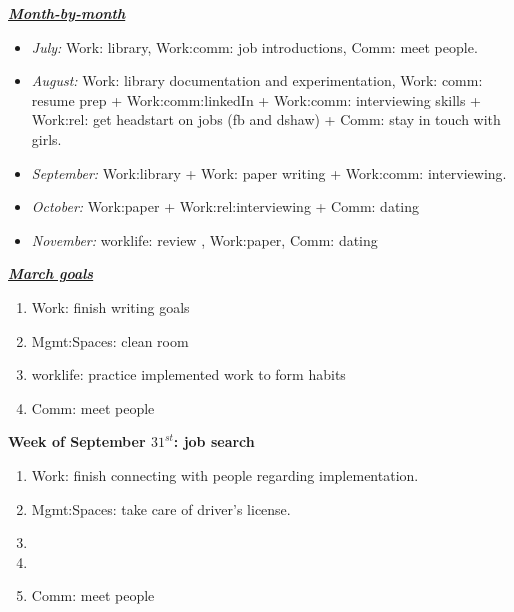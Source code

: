     
    \underline{\it \bf Month-by-month}
      \begin{itemize} 
      \item \small \textit{July:} Work: library, Work:comm: job
        introductions, Comm: meet people.
      \item \small \textit{August:} Work: library documentation and
        experimentation, Work: comm: resume prep + Work:comm:linkedIn
        + Work:comm: interviewing skills + Work:rel: get headstart on
        jobs (fb and dshaw) + Comm: stay in touch with girls. 
      \item \small \textit{September:} Work:library + Work: paper
        writing + Work:comm: interviewing. 
      \item \small \textit{October:} Work:paper +
        Work:rel:interviewing + Comm: dating 
      \item \small \textit{November:} worklife: review , Work:paper, Comm: dating 

      \end{itemize}

\underline{\it \bf March goals}
\begin{enumerate} 
\item \small Work: finish writing goals
  \small \item \small Mgmt:Spaces: clean room 
\item \small worklife: practice implemented work to form habits 
\item \small Comm: meet people 
\end{enumerate}

\begin{block}{\small \bf Week of September $31^{st}$: job search}
  \begin{enumerate}
\tiny \item \tiny Work: finish connecting with people regarding
implementation. 
\item \tiny Mgmt:Spaces: take care of driver's license. 
\item \tiny 
\item \tiny 
\item \tiny Comm: meet people 
\end{enumerate}
\end{block}


